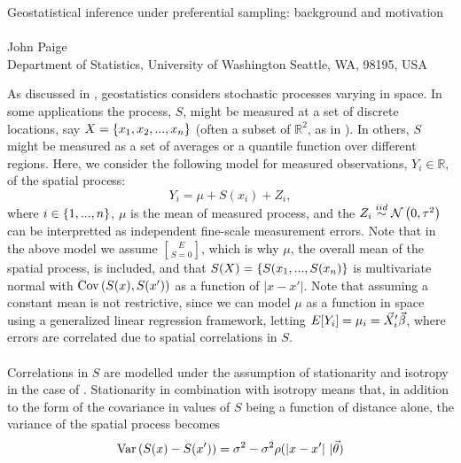 \documentclass{uwstat572}
\begin{document}

\begin{center}
  {\LARGE Geostatistical inference under preferential sampling: background and motivation}\\\ \\
  {John Paige \\ 
    Department of Statistics, University of Washington Seattle, WA, 98195, USA
  }
\end{center}

As discussed in \citet{diggle2010}, geostatistics considers stochastic processes varying in space.  In some applications the process, $S$, might be measured at a set of discrete locations, say $X = \left\{x_1, x_2, ..., x_n\right\}$ (often a subset of $\mathbb{R}^2$, as in \citet{diggle2010}).  In others, $S$ might be measured as a set of averages or a quantile function over different regions.  Here, we consider the following model for measured observations, $Y_i \in \mathbb{R}$, of the spatial process:
\begin{equation}
Y_i = \mu + S(x_i) + Z_i,
\label{model}
\end{equation}
where $i \in \left\{1, ..., n\right\}$, $\mu$ is the mean of measured process, and the $Z_i \stackrel{iid}{\sim} \mathcal{N} \left( 0, \tau^2 \right)$ can be interpretted as independent fine-scale measurement errors.  Note that in the above model we assume $E\brack{S} = 0$, which is why $\mu$, the overall mean of the spatial process, is included, and that $S(X) = \left\{S(x_1, ..., S(x_n)\right\}$ is multivariate normal with $\text{Cov}\left(S(x), S(x')\right)$ as a function of $|x - x'|$.  Note that assuming a constant mean is not restrictive, since we can model $\mu$ as a function in space using a generalized linear regression framework, letting $E[Y_i] = \mu_i = \vec{X}_i' \vec{\beta}$, where errors are correlated due to spatial correlations in $S$.
\\\\
Correlations in $S$ are modelled under the assumption of stationarity and isotropy in the case of \citet{diggle2010}.  Stationarity in combination with isotropy means that, in addition to the form of the covariance in values of $S$ being a function of distance alone, the variance of the spatial process becomes
\begin{equation}
\text{Var}\left(S(x) - S(x')\right) = \sigma^2 - \sigma^2 \rho(|x - x'| \ \vert \vec{\theta})
\label{variogram}
\end{equation}
\end{document}
